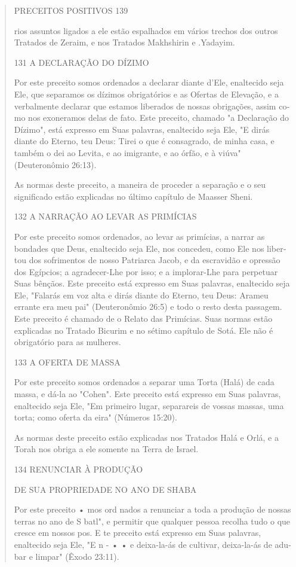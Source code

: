 \begin{quote}
PRECEITOS POSITIVOS 139

rios assuntos ligados a ele estão espalhados em vários trechos dos
outros Trata­dos de Zeraim, e nos Tratados Makhshirin e .Yadayim.

131 A DECLARAÇÃO DO DÍZIMO

Por este preceito somos ordenados a declarar diante d'Ele, enalteci­do
seja Ele, que separamos os dízimos obrigatórios e as Ofertas de
Elevação, e a verbalmente declarar que estamos liberados de nossas
obrigações, assim co­mo nos exoneramos delas de fato. Este preceito,
chamado "a Declaração do Dízimo", está expresso em Suas palavras,
enaltecido seja Ele, "E dirás diante do Eterno, teu Deus: Tirei o que é
consagrado, de minha casa, e também o dei ao Levita, e ao imigrante, e
ao órfão, e à viúva" (Deuteronômio 26:13).

As normas deste preceito, a maneira de proceder a separação e o seu
significado estão explicadas no último capítulo de Maasser Sheni.

132 A NARRAÇÃO AO LEVAR AS PRIMÍCIAS

Por este preceito somos ordenados, ao levar as primícias, a narrar as
bondades que Deus, enaltecido seja Ele, nos concedeu, como Ele nos
liber­tou dos sofrimentos de nosso Patriarca Jacob, e da escravidão e
opressão dos Egípcios; a agradecer-Lhe por isso; e a implorar-Lhe para
perpetuar Suas bên­çãos. Este preceito está expresso em Suas palavras,
enaltecido seja Ele, "Falarás em voz alta e dirás diante do Eterno, teu
Deus: Arameu errante era meu pai" (Deuteronômio 26:5) e todo o resto
desta passagem. Este preceito é chamado de o Relato das Primícias. Suas
normas estão explicadas no Tratado Bicurim e no sétimo capítulo de Sotá.
Ele não é obrigatório para as mulheres.

133 A OFERTA DE MASSA

Por este preceito somos ordenados a separar uma Torta (Halá) de ca­da
massa, e dá-la ao "Cohen". Este preceito está expresso em Suas palavras,
enaltecido seja Ele, "Em primeiro lugar, separareis de vossas massas,
uma torta; como oferta da eira" (Números 15:20).

As normas deste preceito estão explicadas nos Tratados Halá e Orlá, e a
Torah nos obriga a ele somente na Terra de Israel.

134 RENUNCIAR À PRODUÇÃO

DE SUA PROPRIEDADE NO ANO DE SHABA

Por este preceito • mos ord nados a renunciar a toda a produção de
nossas terras no ano de S batl", e permitir que qualquer pessoa recolha
tudo o que cresce em nossos pos. E te preceito está expresso em Suas
pala­vras, enaltecido seja Ele, "E n - • • e deixa-la-ás de cultivar,
deixa-la-ás de adu­bar e limpar" (Êxodo 23:11).


\end{quote}

